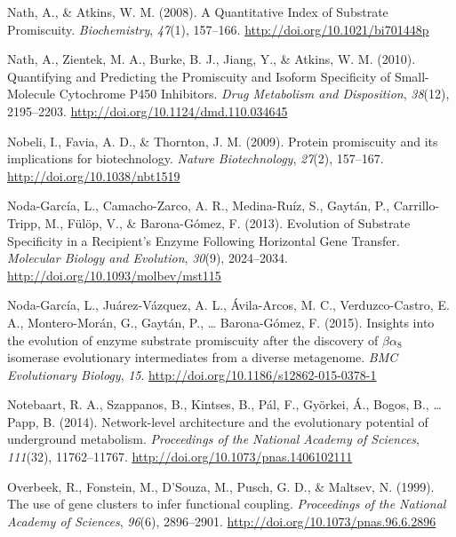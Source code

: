 \documentclass[12pt,twoside]{reedthesis}
\begin{document}
  \hypertarget{ref-nathux5fquantitativeux5f2008}{}
  Nath, A., \& Atkins, W. M. (2008). A Quantitative Index of Substrate
  Promiscuity. \emph{Biochemistry}, \emph{47}(1), 157--166.
  \url{http://doi.org/10.1021/bi701448p}
  
  \hypertarget{ref-nathux5fquantifyingux5f2010}{}
  Nath, A., Zientek, M. A., Burke, B. J., Jiang, Y., \& Atkins, W. M.
  (2010). Quantifying and Predicting the Promiscuity and Isoform
  Specificity of Small-Molecule Cytochrome P450 Inhibitors. \emph{Drug
  Metabolism and Disposition}, \emph{38}(12), 2195--2203.
  \url{http://doi.org/10.1124/dmd.110.034645}
  
  \hypertarget{ref-nobeliux5fproteinux5f2009}{}
  Nobeli, I., Favia, A. D., \& Thornton, J. M. (2009). Protein promiscuity
  and its implications for biotechnology. \emph{Nature Biotechnology},
  \emph{27}(2), 157--167. \url{http://doi.org/10.1038/nbt1519}
  
  \hypertarget{ref-noda-garciaux5fevolutionux5f2013}{}
  Noda-García, L., Camacho-Zarco, A. R., Medina-Ruíz, S., Gaytán, P.,
  Carrillo-Tripp, M., Fülöp, V., \& Barona-Gómez, F. (2013). Evolution of
  Substrate Specificity in a Recipient's Enzyme Following Horizontal Gene
  Transfer. \emph{Molecular Biology and Evolution}, \emph{30}(9),
  2024--2034. \url{http://doi.org/10.1093/molbev/mst115}
  
  \hypertarget{ref-noda-garciaux5finsightsux5f2015}{}
  Noda-García, L., Juárez-Vázquez, A. L., Ávila-Arcos, M. C.,
  Verduzco-Castro, E. A., Montero-Morán, G., Gaytán, P., \ldots{}
  Barona-Gómez, F. (2015). Insights into the evolution of enzyme substrate
  promiscuity after the discovery of \(\beta\alpha_8\) isomerase
  evolutionary intermediates from a diverse metagenome. \emph{BMC
  Evolutionary Biology}, \emph{15}.
  \url{http://doi.org/10.1186/s12862-015-0378-1}
  
  \hypertarget{ref-notebaartux5fnetwork-levelux5f2014}{}
  Notebaart, R. A., Szappanos, B., Kintses, B., Pál, F., Györkei, Á.,
  Bogos, B., \ldots{} Papp, B. (2014). Network-level architecture and the
  evolutionary potential of underground metabolism. \emph{Proceedings of
  the National Academy of Sciences}, \emph{111}(32), 11762--11767.
  \url{http://doi.org/10.1073/pnas.1406102111}
  
  \hypertarget{ref-overbeekux5fuseux5f1999}{}
  Overbeek, R., Fonstein, M., D'Souza, M., Pusch, G. D., \& Maltsev, N.
  (1999). The use of gene clusters to infer functional coupling.
  \emph{Proceedings of the National Academy of Sciences}, \emph{96}(6),
  2896--2901. \url{http://doi.org/10.1073/pnas.96.6.2896}
  
\end{document}
